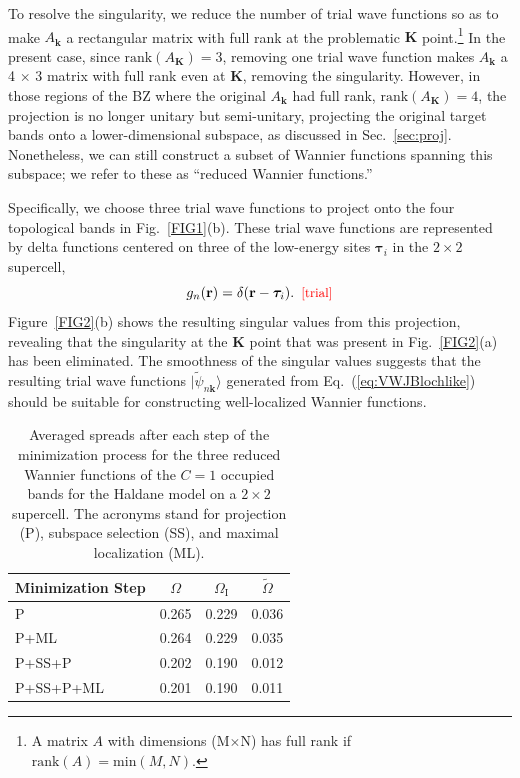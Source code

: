 \documentclass[galley,aps,pra,10pt,amsmath,amssymb,
    superscriptaddress,nofootinbib,longbibliography]{revtex4-2}
\def\Red#1{\textcolor{red}{#1}}
\newcounter{comm}
\newcommand{\eqlab}[1]{\Red{\hbox{\small\;\;[#1]}}\label{eq:#1}}
\newcommand{\eqlab}[1]{\label{eq:#1}}
\newcommand{\eq}[1]{Eq.~(\ref{eq:#1})}
\newcommand{\sref}[1]{Sec.~\ref{sec:#1}}
\newcommand{\ket}[1]{\vert#1\rangle}
\begin{document}
To resolve the singularity, we reduce the number of trial wave functions so as to make $A_{\mathbf{k}}$ a rectangular matrix with full rank at the problematic $\mathbf{K}$ point.\footnote{A matrix $A$ with dimensions (M$\times$N) has full rank if $\text{rank}(A) = \text{min}(M, N)$.} In the present case, since $\text{rank}(A_{\mathbf{K}})=3$, removing one trial wave function makes $A_{\mathbf{k}}$ a 4 $\times$ 3 matrix with full rank even at $\mathbf{K}$, removing the singularity. However, in those regions of the BZ where the original $A_{\mathbf{k}}$ had full rank, $\text{rank}(A_{\mathbf{K}})=4$, the projection is no longer unitary but semi-unitary, projecting the original target bands onto a lower-dimensional subspace, as discussed in \sref{proj}. Nonetheless, we can still construct a subset of Wannier functions spanning this subspace; we refer to these as “reduced Wannier functions.”

Specifically, we choose three trial wave functions to project onto the four topological bands in Fig.~\ref{FIG1}(b). These trial wave functions are represented by delta functions centered on three of the low-energy sites $\boldsymbol{\tau}_i$ in the $2\times2$ supercell,
\begin{equation}
     g_n(\mathbf{r}) = \delta(\mathbf{r} - \boldsymbol{\tau}_i).
     \eqlab{trial}
\end{equation}
Figure~\ref{FIG2}(b) shows the resulting singular values from this projection, revealing that the singularity at the $\mathbf{K}$ point that was present in Fig.~\ref{FIG2}(a) has been eliminated. The smoothness of the singular values suggests that the resulting trial wave functions $\ket{\tilde{\psi}_{n\mathbf{k}}}$ generated from \eq{VWJBlochlike} should be suitable for constructing well-localized Wannier functions.

\newcommand\Tstrut{\rule{0pt}{2.9ex}}  %
\newcommand\Bstrut{\rule[-1.2ex]{0pt}{0pt}} %
\begin{table}[t!]
    \centering
    \begin{ruledtabular}
    \begin{tabular}{lccc}
    Minimization Step & $\Omega$ & $\Omega_\textrm{I}$ &  $\widetilde{\Omega}$  \\
     \hline \Tstrut
     P & 0.265 & 0.229 & 0.036 \\
     P+ML & 0.264 & 0.229 & 0.035  \\
     P+SS+P & 0.202 & 0.190 & 0.012 \\
     P+SS+P+ML & 0.201 & 0.190 & 0.011
    \end{tabular}
    \end{ruledtabular}
    \caption{Averaged spreads after each step of the minimization process for the three reduced Wannier functions of the $C=1$ occupied bands for the Haldane model on a $2\times 2$ supercell. The acronyms stand for projection (P), subspace selection (SS), and maximal localization (ML).} 
    \label{tab:spreads}
\end{table}
\end{document}
